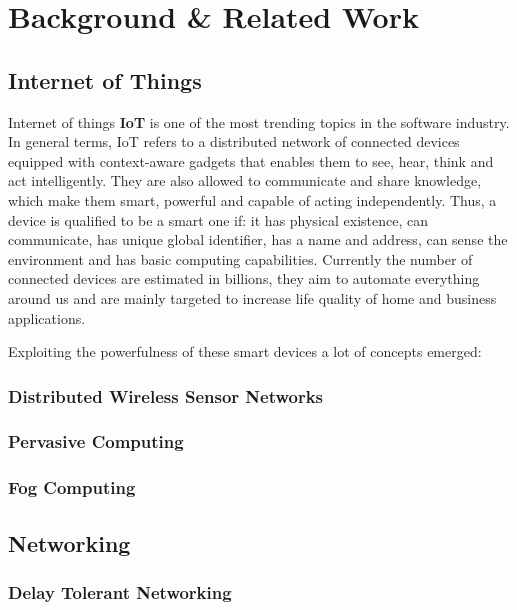
\chapter{Background \& Related Work}\label{chapter:background}

\section{Internet of Things}

Internet of things \textbf{IoT} is one of the most trending topics in the software industry. In general terms, IoT refers to a distributed network of connected devices equipped with context-aware gadgets that enables them to see, hear, think and act intelligently\cite{DAC:DAC2417}. They are also allowed to communicate and share knowledge, which make them smart, powerful and capable of acting independently. Thus, a device is qualified to be a smart one if: it has physical existence, can communicate, has unique global identifier, has a name and address, can sense the environment and has basic computing capabilities\cite{Miorandi20121497}. Currently the number of connected devices are estimated in billions, they aim to automate everything around us and are mainly targeted to increase life quality of home and business applications.


Exploiting the powerfulness of these smart devices a lot of concepts emerged:
\subsection{Distributed Wireless Sensor Networks}

\subsection{Pervasive Computing} 

\subsection{Fog Computing}



\section{Networking}
\subsection{Delay Tolerant Networking}

